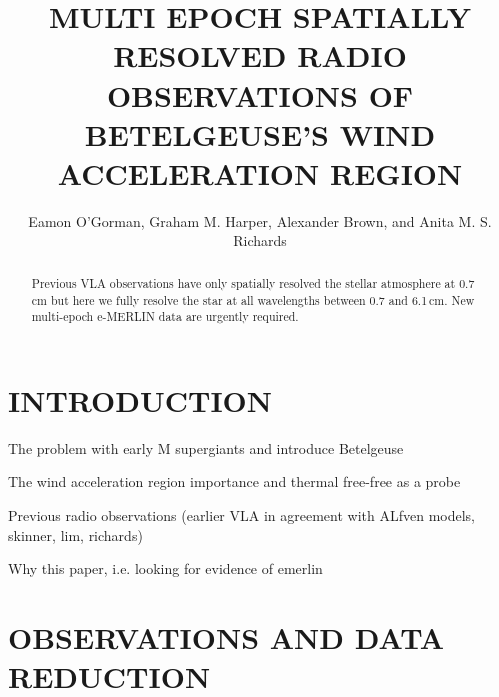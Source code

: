 \documentclass[iop]{emulateapj}
\begin{document}
\title{MULTI EPOCH SPATIALLY RESOLVED RADIO OBSERVATIONS OF BETELGEUSE'S WIND ACCELERATION REGION}


\author{Eamon O'Gorman, Graham M. Harper, Alexander Brown, and Anita M. S. Richards}



\begin{abstract}

Previous VLA observations have only spatially resolved the stellar atmosphere at 0.7\,cm but here we fully resolve the star at all wavelengths between 0.7 and 6.1\,cm. New multi-epoch e-MERLIN data are urgently required.

\end{abstract}


\section{INTRODUCTION}
The problem with early M supergiants and introduce Betelgeuse

The wind acceleration region importance and thermal free-free as a probe

Previous radio observations (earlier VLA in agreement with ALfven models, skinner, lim, richards)

Why this paper, i.e. looking for evidence of emerlin



\section{OBSERVATIONS AND DATA REDUCTION}
\end{document}
